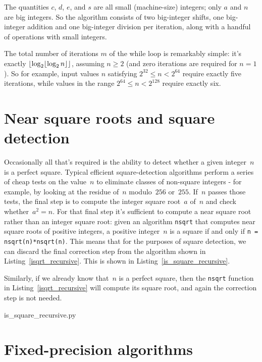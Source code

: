 \documentclass[a4paper]{article}
\DeclarePairedDelimiter\floor{\lfloor}{\rfloor}
\theoremstyle{plain}
\theoremstyle{definition}
\begin{document}
The quantities $c$, $d$, $e$, and $s$ are all small (machine-size) integers;
only $a$ and $n$ are big integers. So the algorithm consists of two big-integer
shifts, one big-integer addition and one big-integer division per iteration,
along with a handful of operations with small integers.

The total number of iterations $m$ of the while loop is remarkably simple: it's
exactly $\floor*{\log_2 \floor{\log_2 n}}$, assuming $n\ge 2$ (and zero
iterations are required for $n = 1$). So for example, input values $n$
satisfying $2^{32} \le n < 2^{64}$ require exactly five iterations, while
values in the range $2^{64} \le n < 2^{128}$ require exactly six.

\section{Near square roots and square detection}

Occasionally all that's required is the ability to detect whether a given
integer~$n$ is a perfect square. Typical efficient square-detection algorithms
perform a series of cheap tests on the value~$n$ to eliminate classes of
non-square integers - for example, by looking at the residue of~$n$
modulo~$256$ or~$255$. If~$n$ passes those tests, the final step is to compute
the integer square root~$a$ of~$n$ and check whether~$a^2 = n$.
For that final step it's sufficient to compute a near square root rather than
an integer square root: given an algorithm \lstinline{nsqrt} that computes near
square roots of positive integers, a positive integer~$n$ is a square if and
only if \lstinline$n = nsqrt(n)*nsqrt(n)$. This means that for the purposes of
square detection, we can discard the final correction step from the algorithm
shown in Listing~\ref{isqrt_recursive}. This is shown in
Listing~\ref{is_square_recursive}.

Similarly, if we already know that~$n$ is a perfect square, then the
\lstinline$nsqrt$ function in Listing~\ref{isqrt_recursive} will compute its
square root, and again the correction step is not needed.


  {is_square_recursive.py}


\section{Fixed-precision algorithms}
\end{document}
